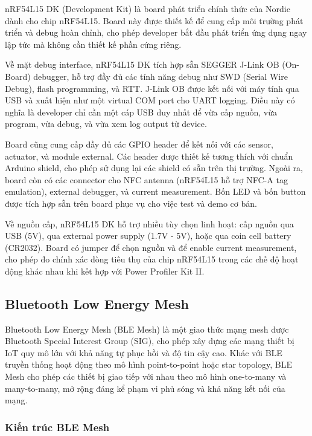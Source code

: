 nRF54L15 DK (Development Kit) là board phát triển chính thức của Nordic dành cho chip nRF54L15. Board này được thiết kế để cung cấp môi trường phát triển và debug hoàn chỉnh, cho phép developer bắt đầu phát triển ứng dụng ngay lập tức mà không cần thiết kế phần cứng riêng.

Về mặt debug interface, nRF54L15 DK tích hợp sẵn SEGGER J-Link OB (On-Board) debugger, hỗ trợ đầy đủ các tính năng debug như SWD (Serial Wire Debug), flash programming, và RTT. J-Link OB được kết nối với máy tính qua USB và xuất hiện như một virtual COM port cho UART logging. Điều này có nghĩa là developer chỉ cần một cáp USB duy nhất để vừa cấp nguồn, vừa program, vừa debug, và vừa xem log output từ device.

Board cũng cung cấp đầy đủ các GPIO header để kết nối với các sensor, actuator, và module external. Các header được thiết kế tương thích với chuẩn Arduino shield, cho phép sử dụng lại các shield có sẵn trên thị trường. Ngoài ra, board còn có các connector cho NFC antenna (nRF54L15 hỗ trợ NFC-A tag emulation), external debugger, và current measurement. Bốn LED và bốn button được tích hợp sẵn trên board phục vụ cho việc test và demo cơ bản.

Về nguồn cấp, nRF54L15 DK hỗ trợ nhiều tùy chọn linh hoạt: cấp nguồn qua USB (5V), qua external power supply (1.7V - 5V), hoặc qua coin cell battery (CR2032). Board có jumper để chọn nguồn và để enable current measurement, cho phép đo chính xác dòng tiêu thụ của chip nRF54L15 trong các chế độ hoạt động khác nhau khi kết hợp với Power Profiler Kit II.


\subsection{Bluetooth Low Energy Mesh}

Bluetooth Low Energy Mesh (BLE Mesh) là một giao thức mạng mesh được Bluetooth Special Interest Group (SIG), cho phép xây dựng các mạng thiết bị IoT quy mô lớn với khả năng tự phục hồi và độ tin cậy cao. Khác với BLE truyền thống hoạt động theo mô hình point-to-point hoặc star topology, BLE Mesh cho phép các thiết bị giao tiếp với nhau theo mô hình one-to-many và many-to-many, mở rộng đáng kể phạm vi phủ sóng và khả năng kết nối của mạng.

\subsubsection{Kiến trúc BLE Mesh}

